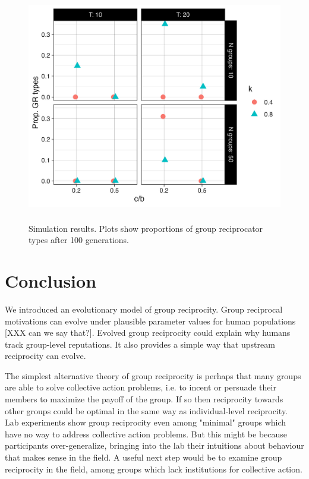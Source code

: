 \documentclass[12pt,a4paper]{article}
\begin{document}
\begin{figure}[h]
  \caption{Simulation results. Plots show proportions of group reciprocator types after 100 generations.}
  \label{fig:sims}
  \centering
    \includegraphics[height=4in]{R files/basic-experiment.jpeg}
\end{figure}

\section{Conclusion}

We introduced an evolutionary model of group reciprocity. Group reciprocal 
motivations can evolve under plausible parameter values for human populations 
[XXX can we say that?]. Evolved group reciprocity could explain why humans
track group-level reputations. It also provides a simple way that upstream
reciprocity can evolve. 

The simplest alternative theory of group reciprocity is perhaps that many groups
are able to solve collective action problems, i.e. to incent or persuade
their members to maximize the payoff of the group. If so then reciprocity 
towards other groups could be optimal in the same way as individual-level
reciprocity. Lab experiments show group reciprocity even among "minimal" groups 
which have no way to address collective action problems. But this might be
because participants over-generalize, bringing into the lab their intuitions 
about behaviour that makes sense in the field. A useful next step would be to
examine group reciprocity in the field, among groups which lack institutions
for collective action.
\end{document}
